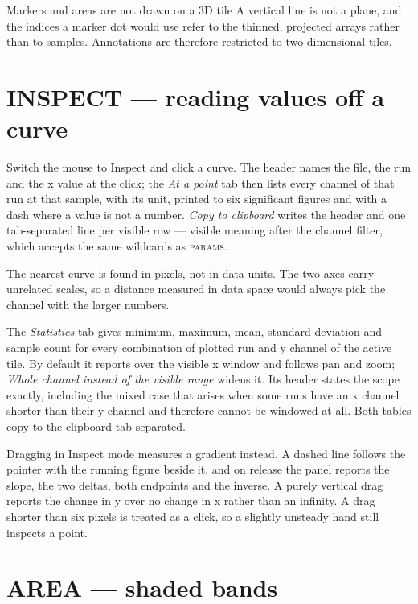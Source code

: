 \documentclass[11pt,a4paper,oneside]{report}
\newcommand{\tab}[1]{\textsc{#1}}
\begin{document}
\begin{aoelimit}{Markers and areas are not drawn on a 3D tile}
A vertical line is not a plane, and the indices a marker dot would use refer to
the thinned, projected arrays rather than to samples. Annotations are therefore
restricted to two-dimensional tiles.
\end{aoelimit}

\section{INSPECT --- reading values off a curve}

Switch the mouse to Inspect and click a curve. The header names the file, the run
and the x value at the click; the \emph{At a point} tab then lists every channel
of that run at that sample, with its unit, printed to six significant figures and
with a dash where a value is not a number. \emph{Copy to clipboard} writes the
header and one tab-separated line per visible row --- visible meaning after the
channel filter, which accepts the same wildcards as \tab{params}.

The nearest curve is found in pixels, not in data units. The two axes carry
unrelated scales, so a distance measured in data space would always pick the
channel with the larger numbers.

The \emph{Statistics} tab gives minimum, maximum, mean, standard deviation and
sample count for every combination of plotted run and y channel of the active
tile. By default it reports over the visible x window and follows pan and zoom;
\emph{Whole channel instead of the visible range} widens it. Its header states
the scope exactly, including the mixed case that arises when some runs have an x
channel shorter than their y channel and therefore cannot be windowed at all.
Both tables copy to the clipboard tab-separated.

Dragging in Inspect mode measures a gradient instead. A dashed line follows the
pointer with the running figure beside it, and on release the panel reports the
slope, the two deltas, both endpoints and the inverse. A purely vertical drag
reports the change in y over no change in x rather than an infinity. A drag
shorter than six pixels is treated as a click, so a slightly unsteady hand still
inspects a point.

\section{AREA --- shaded bands}
\end{document}
